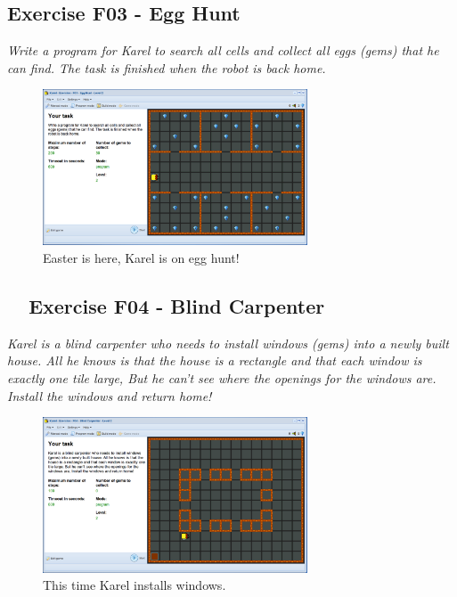 \documentclass[article,A4,12pt]{llncs}
\begin{document}
\subsection{Exercise F03 - Egg Hunt}

{\em Write a program for Karel to search all cells and collect all eggs (gems) that he can find. The task is finished when the robot is back home.}


\begin{figure}[!ht]
\begin{center}
\includegraphics[width=0.7\textwidth]{img/f03.png}
\end{center}
\vspace{-4mm}
\caption{Easter is here, Karel is on egg hunt!}
\label{fig:f03}
\vspace{-10mm}
\end{figure}
\noindent

\subsection{\ \ Exercise F04 - Blind Carpenter}

{\em Karel is a blind carpenter who needs to install windows (gems) into a newly built house. All he knows is that the house is a rectangle and that each window is exactly one tile large, But he can't see where the openings for the windows are. Install the windows and return home!}


\begin{figure}[!ht]
\begin{center}
\includegraphics[width=0.7\textwidth]{img/f04.png}
\end{center}
\vspace{-4mm}
\caption{This time Karel installs windows.}
\label{fig:f04}
\end{figure}
\noindent
\end{document}
